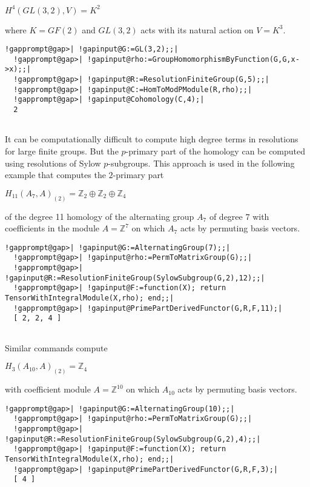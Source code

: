 \documentclass[a4paper,11pt]{report}
\begin{document}
{{$H^4(GL(3,2),V) =K^2$ 

where $K=GF(2)$ and $GL(3,2)$ acts with its natural action on $V=K^3$. 
\begin{Verbatim}[commandchars=!@|,fontsize=\small,frame=single,label=Example]
  !gapprompt@gap>| !gapinput@G:=GL(3,2);;|
  !gapprompt@gap>| !gapinput@rho:=GroupHomomorphismByFunction(G,G,x->x);;|
  !gapprompt@gap>| !gapinput@R:=ResolutionFiniteGroup(G,5);;|
  !gapprompt@gap>| !gapinput@C:=HomToModPModule(R,rho);;|
  !gapprompt@gap>| !gapinput@Cohomology(C,4);|
  2
  
\end{Verbatim}
 

 It can be computationally difficult to compute high degree terms in
resolutions for large finite groups. But the $p$-primary part of the homology can be computed using resolutions of Sylow $p$-subgroups. This approach is used in the following example that computes the $2$-primary part 

$H_{11}(A_7,A)_{(2)} = \mathbb Z_2 \oplus \mathbb Z_2\oplus \mathbb Z_4$ 

of the degree 11 homology of the alternating group $A_7$ of degree $7$ with coefficients in the module $A=\mathbb Z^7$ on which $A_7$ acts by permuting basis vectors. 
\begin{Verbatim}[commandchars=!@|,fontsize=\small,frame=single,label=Example]
  !gapprompt@gap>| !gapinput@G:=AlternatingGroup(7);;|
  !gapprompt@gap>| !gapinput@rho:=PermToMatrixGroup(G);;|
  !gapprompt@gap>| !gapinput@R:=ResolutionFiniteGroup(SylowSubgroup(G,2),12);;|
  !gapprompt@gap>| !gapinput@F:=function(X); return TensorWithIntegralModule(X,rho); end;;|
  !gapprompt@gap>| !gapinput@PrimePartDerivedFunctor(G,R,F,11);|
  [ 2, 2, 4 ]
  
\end{Verbatim}
 Similar commands compute 

$H_{3}(A_{10},A)_{(2)} = \mathbb Z_4$ 

with coefficient module $A=\mathbb Z^{10}$ on which $A_{10}$ acts by permuting basis vectors. 
\begin{Verbatim}[commandchars=!@|,fontsize=\small,frame=single,label=Example]
  !gapprompt@gap>| !gapinput@G:=AlternatingGroup(10);;|
  !gapprompt@gap>| !gapinput@rho:=PermToMatrixGroup(G);;|
  !gapprompt@gap>| !gapinput@R:=ResolutionFiniteGroup(SylowSubgroup(G,2),4);;|
  !gapprompt@gap>| !gapinput@F:=function(X); return TensorWithIntegralModule(X,rho); end;;|
  !gapprompt@gap>| !gapinput@PrimePartDerivedFunctor(G,R,F,3);|
  [ 4 ]
  

\end{Verbatim}}}
\end{document}
